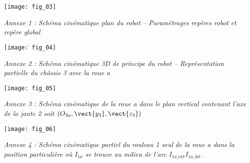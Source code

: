 \begin{center}
\texttt{[image: fig\_03]}

\textit{Annexe 1 : Schéma cinématique plan du robot -- Paramétrages repères robot et repère global}
\end{center}
\begin{center}
\texttt{[image: fig\_04]}

\textit{Annexe 2 : Schéma cinématique 3D de principe du robot -- Représentation partielle du châssis 3 avec la roue a}
\end{center}
\begin{center}
\texttt{[image: fig\_05]}

\textit{Annexe 3 : Schéma cinématique de la roue a dans le plan vertical contenant l'axe de la jante 2 soit $\left( O_{3a},\vect{y_3},\vect{z_3}\right)$}
\end{center}
\begin{center}
\texttt{[image: fig\_06]}

\textit{Annexe 4 : Schéma cinématique partiel du rouleau 1 seul de la roue a dans la position particulière où $I_{1a}$ se trouve au milieu de l'arc $I_{1a\_\text{ext}}I_{1a\_\text{int}}$.}

\end{center}
